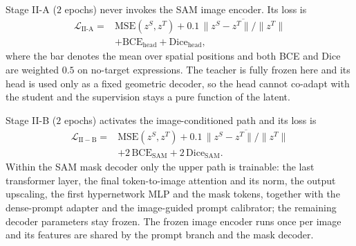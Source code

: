 Stage II-A ($2$ epochs) never invokes the SAM image encoder. Its loss is
\begin{equation}
\begin{aligned}
\mathcal{L}_{\mathrm{II\text{-}A}} = {}& \mathrm{MSE}(z^S,z^T)
 + 0.1\,\overline{\lVert z^S-z^T\rVert/\lVert z^T\rVert} \\
 & + \mathrm{BCE}_{\mathrm{head}} + \mathrm{Dice}_{\mathrm{head}},
\end{aligned}
\end{equation}
where the bar denotes the mean over spatial positions and both BCE and Dice are weighted $0.5$ on no-target expressions. The teacher is fully frozen here and its head is used only as a fixed geometric decoder, so the head cannot co-adapt with the student and the supervision stays a pure function of the latent.

Stage II-B ($2$ epochs) activates the image-conditioned path and its loss is
\begin{equation}
\begin{aligned}
\mathcal{L}_{\mathrm{II-B}} = {}& \mathrm{MSE}(z^S,z^T)
 + 0.1\,\overline{\lVert z^S-z^T\rVert/\lVert z^T\rVert} \\
 & + 2\,\mathrm{BCE}_{\mathrm{SAM}} + 2\,\mathrm{Dice}_{\mathrm{SAM}} .
\end{aligned}
\end{equation}
Within the SAM mask decoder only the upper path is trainable: the last transformer layer, the final token-to-image attention and its norm, the output upscaling, the first hypernetwork MLP and the mask tokens, together with the dense-prompt adapter and the image-guided prompt calibrator; the remaining decoder parameters stay frozen. The frozen image encoder runs once per image and its features are shared by the prompt branch and the mask decoder.

